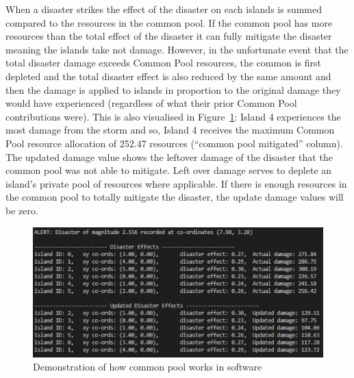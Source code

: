 When a disaster strikes the effect of the disaster on each islands is summed compared to the resources in the common pool. If the common pool has more resources than the total effect of the disaster it can fully mitigate the disaster meaning the islands take not damage. However, in the unfortunate event that the total disaster damage exceeds Common Pool resources, the common is first depleted and the total disaster effect is also reduced by the same amount and then the damage is applied to islands in proportion to the original damage they would have experienced (regardless of what their prior Common Pool contributions were). This is also visualised in Figure~\ref{fig:Common Pool infrastructure outcome}: Island 4 experiences the most damage from the storm and so, Island 4 receives the maximum Common Pool resource allocation of 252.47 resources (“common pool mitigated” column). The updated damage value shows the leftover damage of the disaster that the common pool was not able to mitigate. Left over damage serves to deplete an island's private pool of resources where applicable. If there is enough resources in the common pool to totally mitigate the disaster, the update damage values will be zero.

\begin{figure}[!htb]
    \centering
    \includegraphics[width=1\textwidth]{04_environment/images/Common Pool infrastructure outcome.PNG}
    \caption{Demonstration of how common pool works in software}
    \label{fig:Common Pool infrastructure outcome}
\end{figure}

